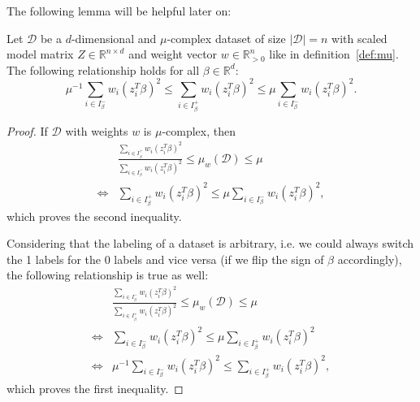The following lemma will be helpful later on:
\begin{lemma}
    \label{lemma:mu-inequalities}
    Let $\mathcal{D}$ be a $d$-dimensional and $\mu$-complex dataset of size
    $|\mathcal{D}|=n$ with scaled
    model matrix $Z \in \mathbb{R}^{n \times d}$ and weight
    vector $w \in \mathbb{R}^n_{>0}$ like in
    definition~\ref{def:mu}.
    The following relationship holds for all $\beta \in \mathbb{R}^d$:
    \begin{equation*}
        \mu^{-1} \sum_{i \in I_\beta^-} w_i (z_i^T \beta)^2
        \leq \sum_{i \in I_\beta^+} w_i (z_i^T \beta)^2
        \leq \mu \sum_{i \in I_\beta^-} w_i (z_i^T \beta)^2.
    \end{equation*}
\end{lemma}
\begin{proof}
    If $\mathcal{D}$ with weights $w$ is $\mu$-complex, then
    \begin{align*}
             & \frac{\sum_{i \in I_\beta^+} w_i (z_i^T \beta)^2}{\sum_{i \in I_\beta^-} w_i (z_i^T \beta)^2}
        \leq \mu_w(\mathcal{D}) \leq \mu                                                                     \\
        \iff &
        \sum_{i \in I_\beta^+} w_i (z_i^T \beta)^2
        \leq \mu \sum_{i \in I_\beta^-} w_i (z_i^T \beta)^2,
    \end{align*}
    which proves the second inequality.

    Considering that the labeling of a dataset is arbitrary, i.e. we
    could always switch the 1 labels for the 0 labels and vice versa
    (if we flip the sign of $\beta$
    accordingly),
    the following relationship is true as well:
    \begin{align*}
             & \frac{\sum_{i \in I_\beta^-} w_i (z_i^T \beta)^2}{\sum_{i \in I_\beta^+} w_i (z_i^T \beta)^2}
        \leq \mu_w(\mathcal{D}) \leq \mu                                                                     \\
        \iff &
        \sum_{i \in I_\beta^-} w_i (z_i^T \beta)^2
        \leq \mu \sum_{i \in I_\beta^+} w_i (z_i^T \beta)^2                                                  \\
        \iff &
        \mu^{-1} \sum_{i \in I_\beta^-} w_i (z_i^T \beta)^2
        \leq \sum_{i \in I_\beta^+} w_i (z_i^T \beta)^2,
    \end{align*}
    which proves the first inequality.
\end{proof}

